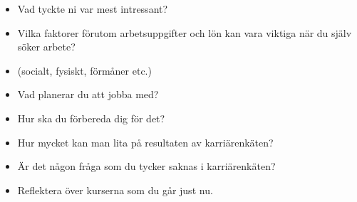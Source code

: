 \mode*

\begin{frame}
  \begin{question}
    \begin{itemize}
      \item Vad tyckte ni var mest intressant?
    \end{itemize}
  \end{question}
\end{frame}

\begin{frame}
  \begin{question}
    \begin{itemize}
      \item Vilka faktorer förutom arbetsuppgifter och lön kan vara viktiga när 
        du själv söker arbete?
      \item (socialt, fysiskt, förmåner etc.)
    \end{itemize}
  \end{question}
\end{frame}

\begin{frame}
  \begin{question}
    \begin{itemize}
      \item Vad planerar du att jobba med?
      \item Hur ska du förbereda dig för det?
    \end{itemize}
  \end{question}
\end{frame}

\begin{frame}
  \begin{question}
    \begin{itemize}
      \item Hur mycket kan man lita på resultaten av karriärenkäten?
      \item Är det någon fråga som du tycker saknas i karriärenkäten?
    \end{itemize}
  \end{question}
\end{frame}

\begin{frame}
  \begin{question}
    \begin{itemize}
      \item Reflektera över kurserna som du går just nu.
    \end{itemize}
  \end{question}
\end{frame}

